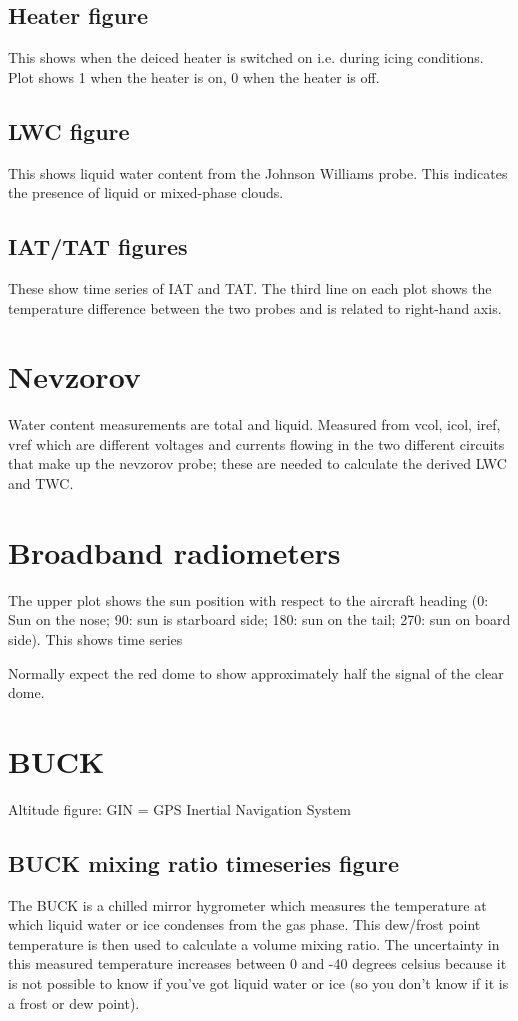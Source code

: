 \subsection*{Heater figure}
This shows when the deiced heater is switched on i.e. during icing conditions. Plot shows 1 when the heater is on, 0 when the heater is off. 

\subsection*{LWC figure}
This shows liquid water content from the Johnson Williams probe. This indicates the presence of liquid or mixed-phase clouds. 

\subsection*{IAT/TAT figures}
These show time series of IAT and TAT. The third line on each plot shows the temperature difference between the two probes and is related to right-hand axis. 

\section*{Nevzorov}
Water content measurements are total and liquid. Measured from vcol, icol, iref, vref which are different voltages and currents flowing in the two different circuits that make up the nevzorov probe; these are needed to
calculate the derived LWC and TWC. 

\section*{Broadband radiometers}
The upper plot shows the sun position with respect to the aircraft heading (0: Sun on the nose; 90: sun is starboard side; 180: sun on the tail; 270: sun on board side).
This shows time series 

Normally expect the red dome to show approximately half the signal of the clear dome. 



\section*{BUCK}
Altitude figure:
GIN = GPS Inertial Navigation System

\subsection*{BUCK mixing ratio timeseries figure}
The BUCK is a chilled mirror hygrometer which measures the temperature at which liquid water or ice condenses from the gas phase. This dew/frost point temperature is then used to calculate a volume mixing ratio. 
The uncertainty in this measured temperature increases between 0 and -40 degrees celsius because it is not possible to know if you've got liquid water or ice (so you don't know if it is a frost or dew point). 

